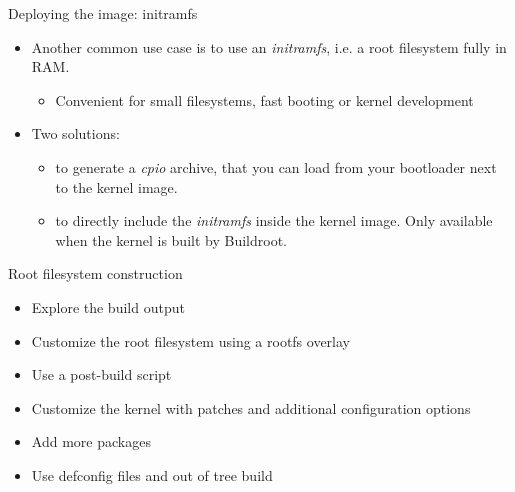\begin{frame}{Deploying the image: initramfs}
  \begin{itemize}

  \item Another common use case is to use an {\em initramfs}, i.e. a
    root filesystem fully in RAM.
    \begin{itemize}
    \item Convenient for small filesystems, fast booting or kernel
      development
    \end{itemize}
  \item Two solutions:
    \begin{itemize}
    \item {} to generate a {\em cpio}
      archive, that you can load from your bootloader next to the
      kernel image.
    \item {} to directly include the
      {\em initramfs} inside the kernel image. Only available when the
      kernel is built by Buildroot.
    \end{itemize}
  \end{itemize}
\end{frame}

\setuplabframe
{Root filesystem construction}
{
  \begin{itemize}
  \item Explore the build output
  \item Customize the root filesystem using a rootfs overlay
  \item Use a post-build script
  \item Customize the kernel with patches and additional configuration
    options
  \item Add more packages
  \item Use defconfig files and out of tree build
  \end{itemize}
}
